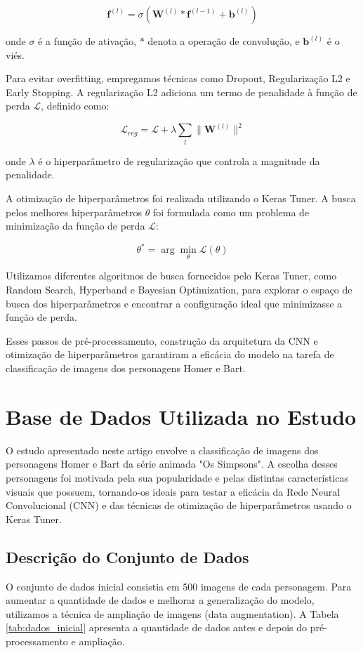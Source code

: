 \documentclass{article}
\begin{document}
\[
\mathbf{f}^{(l)} = \sigma(\mathbf{W}^{(l)} * \mathbf{f}^{(l-1)} + \mathbf{b}^{(l)})
\]

onde \( \sigma \) é a função de ativação, \( * \) denota a operação de convolução, e \( \mathbf{b}^{(l)} \) é o viés.

Para evitar overfitting, empregamos técnicas como Dropout, Regularização L2 e Early Stopping. A regularização L2 adiciona um termo de penalidade à função de perda \( \mathcal{L} \), definido como:

\[
\mathcal{L}_{reg} = \mathcal{L} + \lambda \sum_{l} \|\mathbf{W}^{(l)}\|^2
\]

onde \( \lambda \) é o hiperparâmetro de regularização que controla a magnitude da penalidade.

A otimização de hiperparâmetros foi realizada utilizando o Keras Tuner. A busca pelos melhores hiperparâmetros \( \theta \) foi formulada como um problema de minimização da função de perda \( \mathcal{L} \):

\[
\theta^* = \arg \min_{\theta} \mathcal{L}(\theta)
\]

Utilizamos diferentes algoritmos de busca fornecidos pelo Keras Tuner, como Random Search, Hyperband e Bayesian Optimization, para explorar o espaço de busca dos hiperparâmetros e encontrar a configuração ideal que minimizasse a função de perda.

Esses passos de pré-processamento, construção da arquitetura da CNN e otimização de hiperparâmetros garantiram a eficácia do modelo na tarefa de classificação de imagens dos personagens Homer e Bart.

\section{Base de Dados Utilizada no Estudo}

O estudo apresentado neste artigo envolve a classificação de imagens dos personagens Homer e Bart da série animada "Os Simpsons". A escolha desses personagens foi motivada pela sua popularidade e pelas distintas características visuais que possuem, tornando-os ideais para testar a eficácia da Rede Neural Convolucional (CNN) e das técnicas de otimização de hiperparâmetros usando o Keras Tuner.

\subsection{Descrição do Conjunto de Dados}

O conjunto de dados inicial consistia em 500 imagens de cada personagem. Para aumentar a quantidade de dados e melhorar a generalização do modelo, utilizamos a técnica de ampliação de imagens (data augmentation). A Tabela \ref{tab:dados_inicial} apresenta a quantidade de dados antes e depois do pré-processamento e ampliação.
\end{document}
